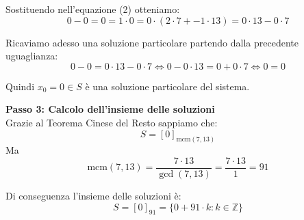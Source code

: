 \documentclass[12pt]{article}
\begin{document}
Sostituendo nell'equazione (2) otteniamo:
$$0 - 0 = 0 = 1 \cdot 0 = 0 \cdot (2 \cdot 7 + -1 \cdot 13) = 0 \cdot 13 - 0 \cdot 7$$

Ricaviamo adesso una soluzione particolare partendo dalla precedente uguaglianza:
$$0 - 0 = 0 \cdot 13 - 0 \cdot 7 \iff 0 - 0 \cdot 13 = 0 + 0 \cdot 7 \iff 0 = 0$$

Quindi $x_0 = 0 \in S$ è una soluzione particolare del sistema.


\textbf{Passo 3: Calcolo dell'insieme delle soluzioni} \\ 
Grazie al Teorema Cinese del Resto sappiamo che:
$$S = [0]_{\mathrm{mcm}(7, 13)}$$
Ma
$$\mathrm{mcm}({7}, {13}) = \frac{{7} \cdot {13}}{\gcd({7},{13})} = \frac{{7} \cdot {13}}{1} = {91}$$

Di conseguenza l'insieme delle soluzioni è:
        $$S = [0]_{91} = \{0 + 91 \cdot k : k \in \mathbb{Z}\}$$
        
\end{document}
